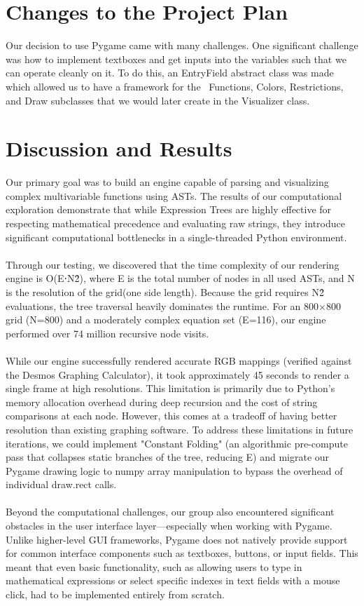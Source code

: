 \documentclass{article}
\begin{document}
\section{\textbf{Changes to the Project Plan}}

Our decision to use Pygame came with many challenges. One significant challenge was how to implement textboxes and get inputs into the variables such that we can operate cleanly on it. To do this, an EntryField abstract class was made which allowed us to have a framework for the  Functions, Colors, Restrictions, and Draw subclasses that we would later create in the Visualizer class.

\section{\textbf{Discussion and Results}}
Our primary goal was to build an engine capable of parsing and visualizing complex multivariable functions using ASTs. The results of our computational exploration demonstrate that while Expression Trees are highly effective for respecting mathematical precedence and evaluating raw strings, they introduce significant computational bottlenecks in a single-threaded Python environment.
\\\\Through our testing, we discovered that the time complexity of our rendering engine is O(E⋅N\^2), where E is the total number of nodes in all used ASTs, and N is the resolution of the grid(one side length). Because the grid requires N\^2 evaluations, the tree traversal heavily dominates the runtime. For an 800×800 grid (N=800) and a moderately complex equation set (E=116), our engine performed over 74 million recursive node visits.
\\\\While our engine successfully rendered accurate RGB mappings (verified against the Desmos Graphing Calculator), it took approximately 45 seconds to render a single frame at high resolutions. This limitation is primarily due to Python's memory allocation overhead during deep recursion and the cost of string comparisons at each node. However, this comes at a tradeoff of having better resolution than existing graphing software. To address these limitations in future iterations, we could implement "Constant Folding" (an algorithmic pre-compute pass that collapses static branches of the tree, reducing E) and migrate our Pygame drawing logic to numpy array manipulation to bypass the overhead of individual draw.rect calls. 
\\\\Beyond the computational challenges, our group also encountered significant obstacles in the user interface layer—especially when working with Pygame. Unlike higher-level GUI frameworks, Pygame does not natively provide support for common interface components such as textboxes, buttons, or input fields. This meant that even basic functionality, such as allowing users to type in mathematical expressions or select specific indexes in text fields with a mouse click, had to be implemented entirely from scratch.
\end{document}
